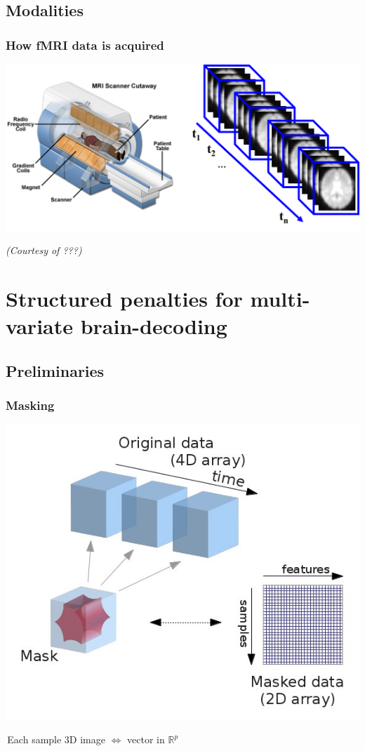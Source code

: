\documentclass{beamer}
\def\mydot{\structure{\rule{1ex}{1ex}}\,}
\begin{document}
\subsection{Modalities}
\begin{frame}\frametitle{How fMRI data is acquired}
    \centering
    \includegraphics[scale=.4]{fmri_setup}

\tiny{\textit{(Courtesy of ???)}}
\end{frame}


\section{Structured penalties for multi-variate brain-decoding}
\subsection{Preliminaries}

\begin{frame}\frametitle{Masking}
  \centering
  \includegraphics[width=.7\linewidth]{masking.jpg}

\mydot Each sample 3D image $\iff$ vector in $\mathbb R^p$%
  
\end{frame}
\end{document}
